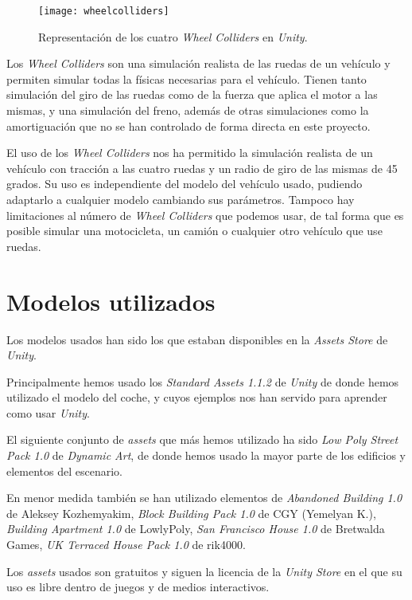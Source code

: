 \begin{figure}[htpb]
    \centering
    \texttt{[image: wheelcolliders]}
    \caption[Representación de los \textit{Wheel Colliders} en \textit{Unity}]{Representación de los cuatro \textit{Wheel Colliders} en \textit{Unity}.}
    \label{fig:basics AFM sketch}
\end{figure}

Los \textit{Wheel Colliders} son una simulación realista de las ruedas de un vehículo y permiten simular todas la físicas necesarias para el vehículo. Tienen tanto simulación del giro de las ruedas como de la fuerza que aplica el motor a las mismas, y una simulación del freno, además de otras simulaciones como la amortiguación que no se han controlado de forma directa en este proyecto.

El uso de los \textit{Wheel Colliders} nos ha permitido la simulación realista de un vehículo con tracción a las cuatro ruedas y un radio de giro de las mismas de 45 grados. Su uso es independiente del modelo del vehículo usado, pudiendo adaptarlo a cualquier modelo cambiando sus parámetros. Tampoco hay limitaciones al número de \textit{Wheel Colliders} que podemos usar, de tal forma que es posible simular una motocicleta, un camión o cualquier otro vehículo que use ruedas.

\section{Modelos utilizados}
Los modelos usados han sido los que estaban disponibles en la \textit{Assets Store} de \textit{Unity}.

Principalmente hemos usado los \textit{Standard Assets 1.1.2} de \textit{Unity} de donde hemos utilizado el modelo del coche, y cuyos ejemplos nos han servido para aprender como usar \textit{Unity}.

El siguiente conjunto de \textit{assets} que más hemos utilizado ha sido \textit{Low Poly Street Pack 1.0} de \textit{Dynamic Art}, de donde hemos usado la mayor parte de los edificios y elementos del escenario.

En menor medida también se han utilizado elementos de \textit{Abandoned Building 1.0} de Aleksey Kozhemyakim, \textit{Block Building Pack 1.0} de CGY (Yemelyan K.), \textit{Building Apartment 1.0} de LowlyPoly, \textit{San Francisco House 1.0} de Bretwalda Games, \textit{UK Terraced House Pack 1.0} de rik4000.

Los \textit{assets} usados son gratuitos y siguen la licencia de la \textit{Unity Store} en el que su uso es libre dentro de juegos y de medios interactivos.

